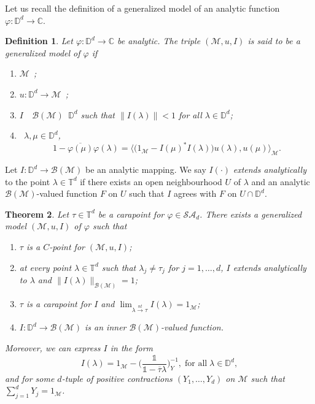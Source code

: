 \documentclass[11pt, reqno]{amsart}
\newtheorem{theorem}{Theorem}[section]
\newtheorem{definition}[theorem]{Definition}
\newcommand\1{\boldsymbol {1}}
\numberwithin{equation}{section}
\begin{document}
 Let us recall the definition of a generalized model of an analytic function $\varphi:\mathbb{D}^{d}\rightarrow \mathbb{C}$.
\begin{definition}{} 
Let $\varphi :\mathbb{D}^{d} \rightarrow \mathbb{C}$ be analytic. The triple $(\mathcal{M},u,I)$ is said to be a {\em{generalized model}} of $\varphi$ if
\begin{enumerate}
\item $\mathcal{M}$~; 
\item $u : \mathbb{D}^{d} \rightarrow \mathcal{M}$~; 
\item $I$~~$\mathcal{B(M)}$~$\mathbb{D}^{d}$ such that $\|I(\lambda)\|<1$ for all $\lambda\in\mathbb{D}^{d}$;
\item {}~$\lambda, \mu \in \mathbb{D}^{d}$,
\begin{equation}\label{generalizedmodelindef}
1-\overline{\varphi(\mu)}\varphi(\lambda) = \Big\langle\big(1_{\mathcal{M}}-I(\mu)^{*}I(\lambda)\big)u({\lambda}),u({\mu}) \Big\rangle_{\mathcal{M}}.
\end{equation}
\end{enumerate}
\end{definition} 

Let $I:\mathbb{D}^{d}\rightarrow \mathcal{B(M)}$ be an analytic mapping.
We say $I(\cdot)$ {\em extends analytically} to the point $\lambda\in\mathbb{T}^{d}$ if there exists an open neighbourhood $U$ of $\lambda$ and an analytic $\mathcal{B}(\mathcal{M})$-valued function $F$ on $U$ such that $I$ agrees with $F$ on $U\cap\mathbb{D}^{d}$. 
\begin{theorem}\label{generalizedmodeltheorem}
Let $\tau \in\mathbb{T}^{d}$ be a carapoint for $\varphi \in\mathcal{SA}_{d}$. There exists a generalized model $(\mathcal{M},u,I)$ of $\varphi$ such that 
\begin{enumerate}
\item $\tau$ is a $C$-point for $(\mathcal{M},u,I)$;
\item at every point $\lambda\in\mathbb{T}^{d}$ such that $\lambda_{j}\neq\tau_{j}$ for $j=1,\hdots,d$, $I$ extends analytically to $\lambda$ and $\|I(\lambda)\|_{\mathcal{B(M)}}=1$;
\item $\tau$ is a carapoint for $I$ and $\lim_{\lambda{\overset{nt}\rightarrow}\tau}I(\lambda)=1_{\mathcal{M}}$;
\item $I:\mathbb{D}^{d}\rightarrow \mathcal{B(M)}$ is an inner $\mathcal{B(M)}$-valued function.
\end{enumerate}
Moreover, we can express $I$ in the form
\begin{equation}\label{Ioperatorgeneralizedmodel}
I(\lambda) = 1_{\mathcal{M}} - \bigg( \dfrac{\mathds{1}}{\mathds{1}-\overline{\tau}\lambda}\bigg)_{Y}^{-1},\; \text{for all} \;\lambda\in\mathbb{D}^{d},
\end{equation}
and for some $d$-tuple of positive contractions $(Y_{1},\hdots,Y_{d})$ on $\mathcal{M}$ such that $\sum_{j=1}^{d}Y_{j}=1_{\mathcal{M}}$.
\end{theorem}
\end{document}
